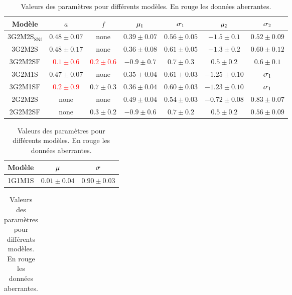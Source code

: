\documentclass{aa}
\begin{document}
\begin{table}[htbp!]
    \centering
    \caption{Valeurs des paramètres pour différents modèles. En rouge les
    données aberrantes.}
    \label{tab:val}
    \begin{tabular}{c c c c c c c}\hline\hline

        \rowcolor{gray!15} Modèle & $a$ & $f$ & $\mu_1$ & $\sigma_1$ & $\mu_2$ &
        $\sigma_2$ \\\hline

        3G2M2S$_{\mathrm{SNf}}$ & $0.48 \pm 0.07$ & none & $0.39 \pm 0.07$ &
        $0.56 \pm 0.05$ & $-1.5 \pm 0.1$ & $0.52 \pm 0.09$ \\

        3G2M2S & $0.48 \pm 0.17$ & none & $0.36 \pm 0.08$ & $0.61 \pm 0.05$ &
        $-1.3 \pm 0.2$ & $0.60 \pm 0.12$ \\

        3G2M2SF & \textcolor{red}{$0.1 \pm 0.6$} & \textcolor{red}{$0.2 \pm
        0.6$} & $-0.9 \pm 0.7$ & $0.7 \pm 0.3$ & $0.5 \pm 0.2$ & $0.6 \pm 0.1$
        \\

        3G2M1S & $0.47 \pm 0.07$ & none & $0.35 \pm 0.04$ & $0.61 \pm 0.03$ &
        $-1.25 \pm 0.10$ & $\sigma_1$ \\

        3G2M1SF & \textcolor{red}{$0.2 \pm 0.9$} & $0.7 \pm 0.3$ & $0.36 \pm
        0.04$ & $0.60 \pm 0.03$ & $-1.23 \pm 0.10$ & $\sigma_1$ \\

        2G2M2S & none & none & $0.49 \pm 0.04$ & $0.54 \pm 0.03$ & $-0.72 \pm
        0.08$ & $0.83 \pm 0.07$ \\
        
        2G2M2SF & none & $0.3 \pm 0.2$ & $-0.9 \pm 0.6$ & $0.7 \pm 0.2$ & $0.5
        \pm 0.2$ & $0.56 \pm 0.09$ \\\hline

    \end{tabular} \bigbreak

\begin{tabular}{c c c}\hline\hline

    \rowcolor{gray!15} Modèle & $\mu$ & $\sigma$ \\\hline

    1G1M1S & $0.01 \pm 0.04$ & $0.90 \pm 0.03$ \\\hline

\end{tabular} \bigbreak

\begin{tabular}{c c c c c}\hline\hline


\end{tabular}
\end{table}
\end{document}
